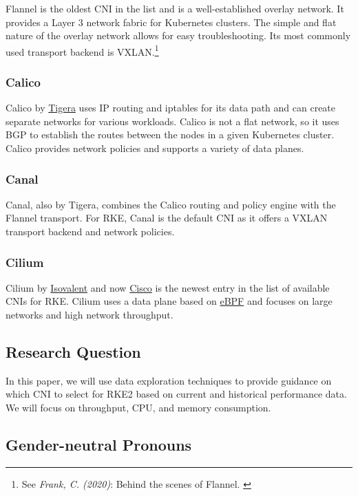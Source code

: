 Flannel is the oldest CNI in the list and is a well-established overlay network. It provides a Layer 3 network fabric for Kubernetes clusters. The simple and flat nature of the overlay network allows for easy troubleshooting. Its most commonly used transport backend is VXLAN.\footnote{See \textit{Frank, C. (2020)}: Behind the scenes of Flannel. \cite{flannel}}

\subsubsection{Calico}

Calico by \href{https://www.tigera.io/}{Tigera} uses IP routing and iptables for its data path and can create separate networks for various workloads. Calico is not a flat network, so it uses BGP to establish the routes between the nodes in a given Kubernetes cluster. Calico provides network policies and supports a variety of data planes.

\subsubsection{Canal}

Canal, also by Tigera, combines the Calico routing and policy engine with the Flannel transport. For RKE, Canal is the default CNI as it offers a VXLAN transport backend and network policies.

\subsubsection{Cilium}

Cilium by \href{https://isovalent.com/}{Isovalent} and now \href{https://www.cisco.com/}{Cisco} is the newest entry in the list of available CNIs for RKE. Cilium uses a data plane based on \href{https://ebpf.io/}{eBPF} and focuses on large networks and high network throughput.

\subsection{Research Question}

In this paper, we will use data exploration techniques to provide guidance on which CNI to select for RKE2 based on current and historical performance data. We will focus on throughput, CPU, and memory consumption.

\subsection{Gender-neutral Pronouns}

